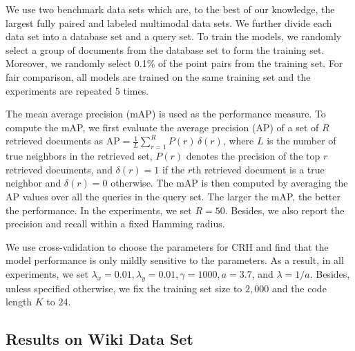 
We use two benchmark data sets which are, to the best of our knowledge, the largest fully paired and labeled multimodal data sets. We further divide each data set into a database set and a query set. To train the models, we randomly select a group of documents from the database set to form the training set. Moreover, we randomly select 0.1\% of the point pairs from the training set. For fair comparison, all models are trained on the same training set and the experiments are repeated 5 times.

The mean average precision (\mbox{mAP}) is used as the performance measure. To compute the \mbox{mAP}, we first evaluate the average precision (\mbox{AP}) of a set of $R$ retrieved documents as $\mbox{AP} = \frac{1}{L}\sum_{r=1}^{R} P(r) \, \delta(r)$, where $L$ is the number of true neighbors in the retrieved set, $P(r)$ denotes the precision of the top $r$ retrieved documents, and $\delta(r)=1$ if the $r$th retrieved document is a true neighbor and $\delta(r)=0$ otherwise.  The \mbox{mAP} is then computed by averaging the \mbox{AP} values over all the queries in the query set. The larger the \mbox{mAP}, the better the performance. In the experiments, we set $R=50$. Besides, we also report the precision and recall within a fixed Hamming radius.

We use cross-validation to choose the parameters for \mbox{CRH} and find that the model performance is only mildly sensitive to the parameters. As a result, in all experiments, we set $\lambda_{x}=0.01, \lambda_{y}=0.01, \gamma = 1000, a=3.7$, and $\lambda=1/a$. Besides, unless specified otherwise, we fix the training set size to $2{,}000$ and the code length $K$ to 24.


\subsection{Results on \mbox{Wiki} Data Set}

